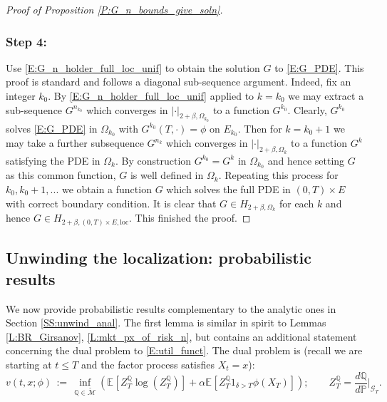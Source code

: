 \documentclass[11pt, letterpaper]{amsart}
\theoremstyle{definition}
\theoremstyle{remark}
\numberwithin{equation}{section}
\newcommand{\prob}{\mathbb{P}}
\newcommand{\qprob}{\mathbb{Q}}
\newcommand{\esp}{\mathbb{E}}
\newcommand{\espalt}[2]{\esp^{#1}\bra{#2}}
\newcommand{\G}{\mathcal{G}}
\newcommand{\tM}{\widetilde{\mathcal{M}}}
\newcommand{\dfn}{\, := \,}
\newcommand{\bra}[1]{\left[#1\right]}
\begin{document}
\begin{proof}[Proof of Proposition \ref{P:G_n_bounds_give_soln}]
\subsubsection*{Step 4:} Use \eqref{E:G_n_holder_full_loc_unif} to obtain the solution $G$ to \eqref{E:G_PDE}.  This proof is standard and follows a diagonal sub-sequence argument.  Indeed, fix an integer $k_0$.  By \eqref{E:G_n_holder_full_loc_unif} applied to $k=k_0$ we may extract a sub-sequence $G^{n_{k_0}}$ which converges in $|\cdot|_{2+\beta,\Omega_{k_0}}$ to a function $G^{k_0}$.  Clearly, $G^{k_0}$ solves \eqref{E:G_PDE} in $\Omega_{k_0}$ with $G^{k_0}(T,\cdot) = \phi$ on $E_{k_0}$. Then for $k=k_0+1$ we may take a further subsequence $G^{n_k}$ which converges in $|\cdot|_{2+\beta,\Omega_k}$ to a function $G^k$ satisfying the PDE in $\Omega_k$.  By construction $G^{k_0} = G^{k}$ in $\Omega_{k_0}$ and hence setting $G$ as this common function, $G$ is well defined in $\Omega_k$.  Repeating this process for $k_0,k_0+1,...$ we obtain a function $G$ which solves the full PDE in $(0,T)\times E$ with correct boundary condition.  It is clear that $G\in H_{2+\beta,\Omega_k}$ for each $k$ and hence $G\in H_{2+\beta,(0,T)\times E,\textrm{loc}}$.  This finished the proof.


\end{proof}

\subsection{Unwinding the localization: probabilistic results}\label{SS:unwind_prob}  We now provide probabilistic results complementary to the analytic ones in Section \ref{SS:unwind_anal}.  The first lemma is similar in spirit to Lemmas \ref{L:BR_Girsanov}, \ref{L:mkt_px_of_risk_n}, but contains an additional statement concerning the dual problem to \eqref{E:util_funct}.  The dual problem is (recall we are starting at $t\leq T$ and the factor process satisfies $X_t = x$):
\begin{equation}\label{E:dual_util_funct}
v(t,x;\phi)\dfn \inf_{\qprob\in\tM}\left(\espalt{}{Z^{\qprob}_T\log\left(Z^{\qprob}_T\right)} + \alpha\espalt{}{Z^{\qprob}_T 1_{\delta>T}\phi(X_T)}\right);\qquad Z^{\qprob}_T =  \frac{d\qprob}{d\prob}\bigg|_{\G_T}.
\end{equation}
\end{document}
